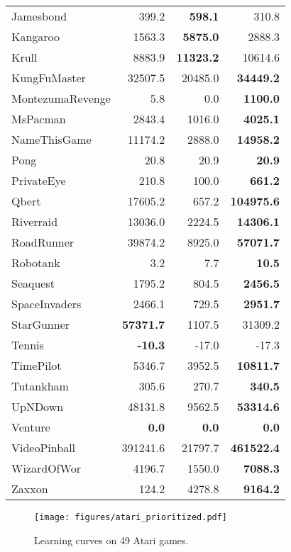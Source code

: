 \documentclass{article}
\begin{document}
\begin{table}[H]
\begin{center}
\begin{tabular}{ l| r r r }
Jamesbond& 399.2& \textbf{598.1}& 310.8\\
Kangaroo& 1563.3& \textbf{5875.0}& 2888.3\\
Krull& 8883.9& \textbf{11323.2}& 10614.6\\
KungFuMaster& 32507.5& 20485.0& \textbf{34449.2}\\
MontezumaRevenge& 5.8& 0.0& \textbf{1100.0}\\
MsPacman& 2843.4& 1016.0& \textbf{4025.1}\\
NameThisGame& 11174.2& 2888.0& \textbf{14958.2}\\
Pong& 20.8& 20.9& \textbf{20.9}\\
PrivateEye& 210.8& 100.0& \textbf{661.2}\\
Qbert& 17605.2& 657.2& \textbf{104975.6}\\
Riverraid& 13036.0& 2224.5& \textbf{14306.1}\\
RoadRunner& 39874.2& 8925.0& \textbf{57071.7}\\
Robotank& 3.2& 7.7& \textbf{10.5}\\
Seaquest& 1795.2& 804.5& \textbf{2456.5}\\
SpaceInvaders& 2466.1& 729.5& \textbf{2951.7}\\
StarGunner& \textbf{57371.7}& 1107.5& 31309.2\\
Tennis& \textbf{-10.3}& -17.0& -17.3\\
TimePilot& 5346.7& 3952.5& \textbf{10811.7}\\
Tutankham& 305.6& 270.7& \textbf{340.5}\\
UpNDown& 48131.8& 9562.5& \textbf{53314.6}\\
Venture& \textbf{0.0}& \textbf{0.0}& \textbf{0.0}\\
VideoPinball& 391241.6& 21797.7& \textbf{461522.4}\\
WizardOfWor& 4196.7& 1550.0& \textbf{7088.3}\\
Zaxxon& 124.2& 4278.8& \textbf{9164.2}\\
\bottomrule
\end{tabular}
\end{center}
\end{table}

\clearpage
\begin{figure}
	\centering
	\texttt{[image: figures/atari\_prioritized.pdf]}
	\vskip -0.1in
	\caption{Learning curves on 49 Atari games. }
	\label{fig:full-curve}
\end{figure} 
\end{document}
